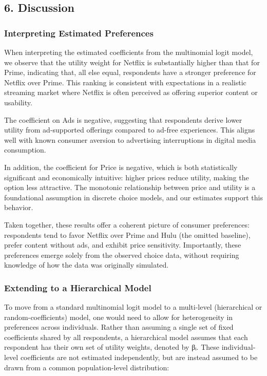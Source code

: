 \documentclass[
  letterpaper,
  DIV=11,
  numbers=noendperiod]{scrartcl}
\begin{document}
\subsection{6. Discussion}\label{discussion}

\subsubsection{Interpreting Estimated
Preferences}\label{interpreting-estimated-preferences}

When interpreting the estimated coefficients from the multinomial logit
model, we observe that the utility weight for Netflix is substantially
higher than that for Prime, indicating that, all else equal, respondents
have a stronger preference for Netflix over Prime. This ranking is
consistent with expectations in a realistic streaming market where
Netflix is often perceived as offering superior content or usability.

The coefficient on Ads is negative, suggesting that respondents derive
lower utility from ad-supported offerings compared to ad-free
experiences. This aligns well with known consumer aversion to
advertising interruptions in digital media consumption.

In addition, the coefficient for Price is negative, which is both
statistically significant and economically intuitive: higher prices
reduce utility, making the option less attractive. The monotonic
relationship between price and utility is a foundational assumption in
discrete choice models, and our estimates support this behavior.

Taken together, these results offer a coherent picture of consumer
preferences: respondents tend to favor Netflix over Prime and Hulu (the
omitted baseline), prefer content without ads, and exhibit price
sensitivity. Importantly, these preferences emerge solely from the
observed choice data, without requiring knowledge of how the data was
originally simulated.

\subsubsection{Extending to a Hierarchical
Model}\label{extending-to-a-hierarchical-model}

To move from a standard multinomial logit model to a multi-level
(hierarchical or random-coefficients) model, one would need to allow for
heterogeneity in preferences across individuals. Rather than assuming a
single set of fixed coefficients shared by all respondents, a
hierarchical model assumes that each respondent has their own set of
utility weights, denoted by βᵢ. These individual-level coefficients are
not estimated independently, but are instead assumed to be drawn from a
common population-level distribution:
\end{document}
